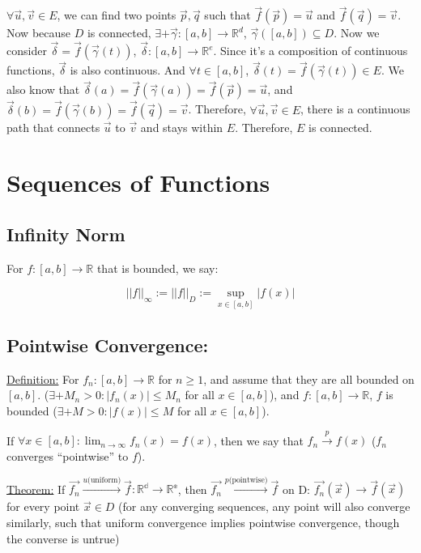 \documentclass[11 pt, twoside]{article}
\begin{document}
$\forall \vec{u}, \vec{v} \in E$, we can find two points $\vec{p}, \vec{q}$ such
that $\vec{f}(\vec{p}) = \vec{u}$ and $\vec{f}(\vec{q}) = \vec{v}$. Now because
$D$ is connected, $\exists+ \vec{\gamma}: [a, b] \to \mathbb{R}^d$,
$\vec{\gamma}([a, b]) \subseteq D$. Now we consider $\vec{\delta} =
\vec{f}(\vec{\gamma}(t))$, $\vec{\delta} : [a, b] \to \mathbb{R}^e$. Since
it's a composition of continuous functions, $\vec{\delta}$ is also continuous.
And $\forall t \in [a, b]$, $\vec{\delta}(t) = \vec{f}(\vec{\gamma}(t)) \in E$.
We also know that $\vec{\delta}(a) = \vec{f}(\vec{\gamma}(a)) = \vec{f}(\vec{p})
= \vec{u}$, and $\vec{\delta}(b) = \vec{f}(\vec{\gamma}(b)) = \vec{f}(\vec{q})
= \vec{v}$. Therefore, $\forall \vec{u}, \vec{v} \in E$, there is a
continuous path that connects $\vec{u}$ to $\vec{v}$ and stays within $E$.
Therefore, $E$ is connected.

\section{Sequences of Functions}
\subsection{Infinity Norm}
For $f: [a,b] \to \mathbb{R}$ that is bounded, we say:

$$||f||_\infty := ||f||_D := \sup_{x\in[a,b]} |f(x)|$$

\subsection{Pointwise Convergence:}

\underline{Definition:}
For $f_n : [a,b] \to \mathbb{R}$ for $n \geq 1$, and assume that they are all bounded on $[a,b]$. ($\exists+ M_n > 0 : |f_n(x)| \leq M_n$ for all $x \in [a,b]$), and $f:[a,b] \to \mathbb{R}$, $f$ is bounded ($\exists+ M > 0: |f(x)| \leq M$ for all $x \in [a,b]$).

If $\forall x \in [a,b]: \lim_{n\to\infty} f_n(x) = f(x)$, then we say that $f_n \overset{p}{\to} f(x)$ ($f_n$ converges ``pointwise'' to $f$).

\underline{Theorem:}
If $\vec{f_n} \overset{u \text{(uniform)}}{\to} \vec{f}: \mathbb{R^d} \to \mathbb{R^e}$, then $\vec{f_n} \overset{p \text{(pointwise)}}{\to} \vec{f}$ on D: $\vec{f_n}(\vec{x}) \to \vec{f}(\vec{x})$ for every point $\vec{x} \in D$ (for any converging sequences, any point will also converge similarly, such that uniform convergence implies pointwise convergence, though the converse is untrue)
\end{document}
